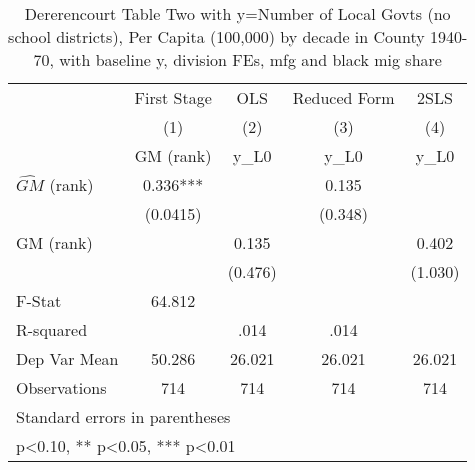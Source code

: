 \begin{table}[htbp]\centering
\def\sym#1{\ifmmode^{#1}\else\(^{#1}\)\fi}
\caption{Dererencourt Table Two with y=Number of Local Govts (no school districts), Per Capita (100,000) by decade in County 1940-70, with baseline y, division FEs, mfg and black mig share}
\begin{tabular}{l*{4}{c}}
\toprule
                    & First Stage   &         OLS   &Reduced Form   &        2SLS   \\
                    &\multicolumn{1}{c}{(1)}&\multicolumn{1}{c}{(2)}&\multicolumn{1}{c}{(3)}&\multicolumn{1}{c}{(4)}\\
                    &\multicolumn{1}{c}{GM  (rank)}&\multicolumn{1}{c}{y\_L0}&\multicolumn{1}{c}{y\_L0}&\multicolumn{1}{c}{y\_L0}\\
\midrule
$\hat{GM}$ (rank)   &       0.336***&               &       0.135   &               \\
                    &    (0.0415)   &               &     (0.348)   &               \\
\addlinespace
GM  (rank)          &               &       0.135   &               &       0.402   \\
                    &               &     (0.476)   &               &     (1.030)   \\
\midrule
F-Stat              &      64.812   &               &               &               \\
R-squared           &               &        .014   &        .014   &               \\
Dep Var Mean        &      50.286   &      26.021   &      26.021   &      26.021   \\
Observations        &         714   &         714   &         714   &         714   \\
\bottomrule
\multicolumn{5}{l}{\footnotesize Standard errors in parentheses}\\
\multicolumn{5}{l}{\footnotesize * p<0.10, ** p<0.05, *** p<0.01}\\
\end{tabular}
\end{table}
